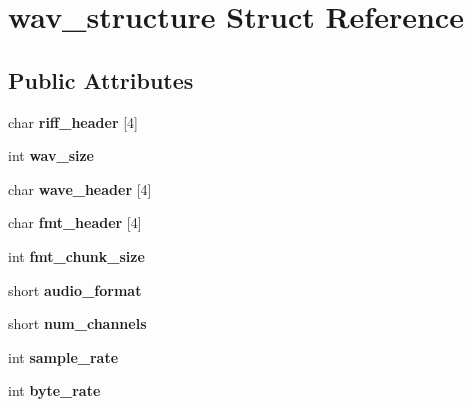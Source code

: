 \hypertarget{structwav__structure}{}\section{wav\+\_\+structure Struct Reference}
\label{structwav__structure}
\subsection*{Public Attributes}
\begin{DoxyCompactItemize}
\item 
\mbox{\label{structwav__structure_ad35aecb7b5845e7534211ba78147e654}} 
char {\bfseries riff\+\_\+header} \mbox{[}4\mbox{]}
\item 
\mbox{\label{structwav__structure_a6d2bb8443d28a8ccf3b966b9dbc4f07e}} 
int {\bfseries wav\+\_\+size}
\item 
\mbox{\label{structwav__structure_a6d0d8e8e285c946daa286d9d677bd65e}} 
char {\bfseries wave\+\_\+header} \mbox{[}4\mbox{]}
\item 
\mbox{\label{structwav__structure_abbf490d30f1c9b4cde91f153191d647e}} 
char {\bfseries fmt\+\_\+header} \mbox{[}4\mbox{]}
\item 
\mbox{\label{structwav__structure_a645d12a1ca6ad1014305cd0eb90608d8}} 
int {\bfseries fmt\+\_\+chunk\+\_\+size}
\item 
\mbox{\label{structwav__structure_a6c5c0ff14207a27f844304416ce154e1}} 
short {\bfseries audio\+\_\+format}
\item 
\mbox{\label{structwav__structure_a0707e063eca7b72ef826724a232fac64}} 
short {\bfseries num\+\_\+channels}
\item 
\mbox{\label{structwav__structure_a877bd6316b99bae4797cf39cb4d004df}} 
int {\bfseries sample\+\_\+rate}
\item 
\mbox{\label{structwav__structure_a9ad4668caab4000604b787d17047a44e}} 
int {\bfseries byte\+\_\+rate}

\end{DoxyCompactItemize}
